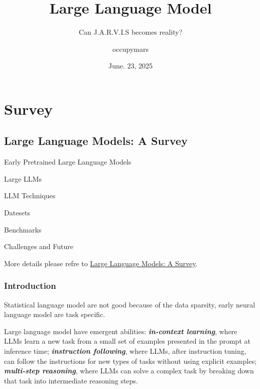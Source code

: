\documentclass[10pt]{elegantbook}
\title{Large Language Model}
\subtitle{Can J.A.R.V.I.S becomes reality?}
\author{occupymars}
\date{June. 23, 2025}
\newcommand{\mydefination}[1]{\textbf{\textit{\textcolor{structurecolor}{#1}}}}
\begin{document}
\maketitle

\frontmatter
\tableofcontents

\mainmatter

\chapter{Survey}

\section{Large Language Models: A Survey}

\begin{introduction}
    \item Early Pretrained Large Language Models
    \item Large LLMs
    \item LLM Techniques
    \item Datesets
    \item Benchmarks
    \item Challenges and Future
\end{introduction}

More details please refre to \href{https://arxiv.org/abs/2402.06196}{Large Language Models: A Survey}.

\subsection{Introduction}
Statistical language model are not good because of the data sparsity, early neural language model are task specific.

Large language model have emergent abilities: \mydefination{in-context learning}, where LLMs learn a new task from a small 
set of examples presented in the prompt at inference time; \mydefination{instruction following}, where
LLMs, after instruction tuning, can follow the instructions for new types of tasks without using explicit examples;
\mydefination{multi-step reasoning}, where LLMs can solve a complex task by breaking down that task into intermediate 
reasoning steps.
\end{document}
